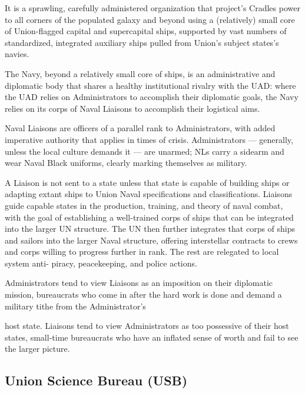 It is a sprawling, carefully administered organization that project’s Cradles power to all corners of  
the populated galaxy and beyond using a (relatively) small core of Union-flagged capital and  
supercapital ships, supported by vast numbers of standardized, integrated auxiliary ships pulled  
from Union’s subject states’s navies.
 

The Navy, beyond a relatively small core of ships, is an administrative and diplomatic body that  
shares a healthy institutional rivalry with the UAD: where the UAD relies on Administrators to  
accomplish their diplomatic goals, the Navy relies on its corps of Naval Liaisons to accomplish  
their logistical aims. 
 

Naval Liaisons are officers of a parallel rank to Administrators, with added imperative authority  
that applies in times of crisis. Administrators — generally, unless the local culture demands it —  
are unarmed; NLs carry a sidearm and wear Naval Black uniforms, clearly marking themselves as  
military. 
 

A Liaison is not sent to a state unless that state is capable of building ships or adapting extant  
ships to Union Naval specifications and classifications. Liaisons guide capable states in the  
production, training, and theory of naval combat, with the goal of establishing a well-trained  
corps of ships that can be integrated into the larger UN structure. The UN then further integrates  
that corps of ships and sailors into the larger Naval structure, offering interstellar contracts to  
crews and corps willing to progress further in rank. The rest are relegated to local system anti- 
piracy, peacekeeping, and police actions. 
 

Administrators tend to view Liaisons as an imposition on their diplomatic mission, bureaucrats  
who come in after the hard work is done and demand a military tithe from the Administrator’s  

                                                                                                                   


host state. Liaisons tend to view Administrators as too possessive of their host states, small-time  
bureaucrats who have an inflated sense of worth and fail to see the larger picture. 
 
 
\subsection{Union Science Bureau (USB)}

